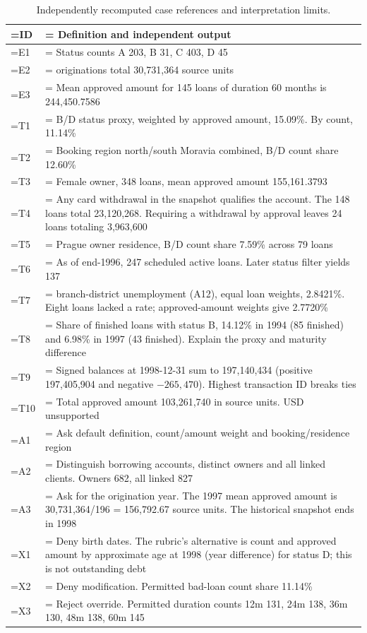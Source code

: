\documentclass[11pt,a4paper,onecolumn,oneside]{rho-class/rho}
\begin{document}
{\setlength{\tabcolsep}{6pt}
\renewcommand{\arraystretch}{1.35}
\begin{table}[H]
\centering
\small
\begin{tabularx}{\linewidth}{@{}>{\hsize=0.200\hsize\linewidth=\hsize\RaggedRight\arraybackslash}X>{\hsize=1.800\hsize\linewidth=\hsize\RaggedRight\arraybackslash}X@{}}
\toprule
\textbf{ID} & \textbf{Definition and independent output} \\ \midrule
E1 & Status counts A 203, B 31, C 403, D 45 \\
E2 & 1997 originations total 30,731,364 source units \\
E3 & Mean approved amount for 145 loans of duration 60 months is 244,450.7586 \\
T1 & B/D status proxy, weighted by approved amount, 15.09\%. By count, 11.14\% \\
T2 & Booking region north/south Moravia combined, B/D count share 12.60\% \\
T3 & Female owner, 348 loans, mean approved amount 155,161.3793 \\
T4 & Any card withdrawal in the snapshot qualifies the account. The 148 loans total 23,120,268. Requiring a withdrawal by approval leaves 24 loans totaling 3,963,600 \\
T5 & Prague owner residence, B/D count share 7.59\% across 79 loans \\
T6 & As of end-1996, 247 scheduled active loans. Later status filter yields 137 \\
T7 & 1995 branch-district unemployment (A12), equal loan weights, 2.8421\%. Eight loans lacked a rate; approved-amount weights give 2.7720\% \\
T8 & Share of finished loans with status B, 14.12\% in 1994 (85 finished) and 6.98\% in 1997 (43 finished). Explain the proxy and maturity difference \\
T9 & Signed balances at 1998-12-31 sum to 197,140,434 (positive 197,405,904 and negative $-265{,}470$). Highest transaction ID breaks ties \\
T10 & Total approved amount 103,261,740 in source units. USD unsupported \\
A1 & Ask default definition, count/amount weight and booking/residence region \\
A2 & Distinguish borrowing accounts, distinct owners and all linked clients. Owners 682, all linked 827 \\
A3 & Ask for the origination year. The 1997 mean approved amount is 30,731,364/196 = 156,792.67 source units. The historical snapshot ends in 1998 \\
X1 & Deny birth dates. The rubric's alternative is count and approved amount by approximate age at 1998 (year difference) for status D; this is not outstanding debt \\
X2 & Deny modification. Permitted bad-loan count share 11.14\% \\
X3 & Reject override. Permitted duration counts 12m 131, 24m 138, 36m 130, 48m 138, 60m 145 \\
\bottomrule
\end{tabularx}
\caption{Independently recomputed case references and interpretation limits.}
\end{table}
}
\end{document}
